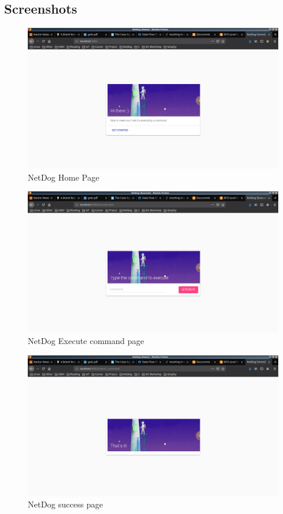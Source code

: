 \subsection{Screenshots}

\begin{figure}[H]
\includegraphics[scale=0.3]{netdog_home}
\caption{NetDog Home Page}
\end{figure}

\begin{figure}[H]
\includegraphics[scale=0.3]{netdog_execute}
\caption{NetDog Execute command page}
\end{figure}

\begin{figure}[H]
\includegraphics[scale=0.3]{netdog_success}
\caption{NetDog success page}
\end{figure}


